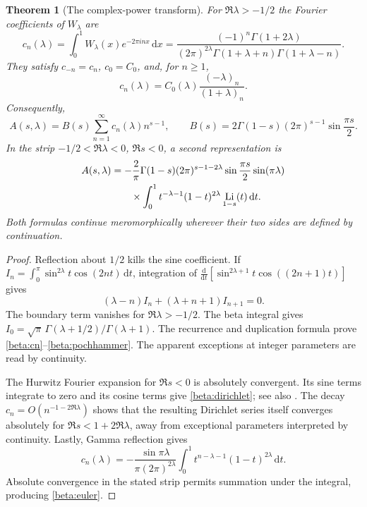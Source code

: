 \documentclass[11pt]{article}
\numberwithin{equation}{section}
\newtheorem{theorem}{Theorem}[section]
\theoremstyle{definition}
\theoremstyle{remark}
\DeclareMathOperator{\Li}{Li}
\newcommand{\dd}{\,\mathrm d}
\begin{document}
\begin{theorem}[The complex-power transform]\label{beta:transform}
For $\Re\lambda>-1/2$ the Fourier coefficients of $W_\lambda$ are
\begin{equation}\label{beta:cn}
 c_n(\lambda)=\int_0^1W_\lambda(x)e^{-2\pi inx}\dd x
 =\frac{(-1)^n\Gamma(1+2\lambda)}
 {(2\pi)^{2\lambda}\Gamma(1+\lambda+n)\Gamma(1+\lambda-n)}.
\end{equation}
They satisfy $c_{-n}=c_n$, $c_0=C_0$, and, for $n\geq1$,
\begin{equation}\label{beta:pochhammer}
 c_n(\lambda)=C_0(\lambda)\frac{(-\lambda)_n}{(1+\lambda)_n}.
\end{equation}
Consequently,
\begin{equation}\label{beta:dirichlet}
 A(s,\lambda)=B(s)\sum_{n=1}^{\infty}c_n(\lambda)n^{s-1},\qquad
 B(s)=2\Gamma(1-s)(2\pi)^{s-1}\sin\frac{\pi s}{2}.
\end{equation}
In the strip $-1/2<\Re\lambda<0$, $\Re s<0$, a second representation is
\begin{align}\label{beta:euler}
 A(s,\lambda)
 &=-\frac{2}{\pi}\Gamma(1-s)(2\pi)^{s-1-2\lambda}
      \sin\frac{\pi s}{2}\sin(\pi\lambda)\notag\\
 &\hspace{2em}\times
 \int_0^1t^{-\lambda-1}(1-t)^{2\lambda}\Li_{1-s}(t)\dd t.
\end{align}
Both formulas continue meromorphically wherever their two sides are
defined by continuation.
\end{theorem}

\begin{proof}
Reflection about $1/2$ kills the sine coefficient. If
$I_n=\int_0^\pi\sin^{2\lambda}t\cos(2nt)\dd t$, integration of
$\frac{\mathrm d}{\mathrm dt}
 [\sin^{2\lambda+1}t\cos((2n+1)t)]$ gives
\[
 (\lambda-n)I_n+(\lambda+n+1)I_{n+1}=0.
\]
The boundary term vanishes for $\Re\lambda>-1/2$.
The beta integral gives
$I_0=\sqrt\pi\,\Gamma(\lambda+1/2)/\Gamma(\lambda+1)$.
The recurrence and duplication formula prove
\eqref{beta:cn}--\eqref{beta:pochhammer}. The apparent exceptions at
integer parameters are read by continuity.

The Hurwitz Fourier expansion for $\Re s<0$ is absolutely convergent.
Its sine terms integrate to zero and its cosine terms give
\eqref{beta:dirichlet}; see also \cite[\S25.11]{DLMFHurwitz}.
The decay $c_n=O(n^{-1-2\Re\lambda})$ shows that the resulting
Dirichlet series itself converges absolutely for
$\Re s<1+2\Re\lambda$, away from exceptional parameters interpreted
by continuity. Lastly, Gamma reflection gives
\[
 c_n(\lambda)=-\frac{\sin\pi\lambda}{\pi(2\pi)^{2\lambda}}
 \int_0^1t^{n-\lambda-1}(1-t)^{2\lambda}\dd t.
\]
Absolute convergence in the stated strip permits summation under the
integral, producing \eqref{beta:euler}.
\end{proof}
\end{document}
